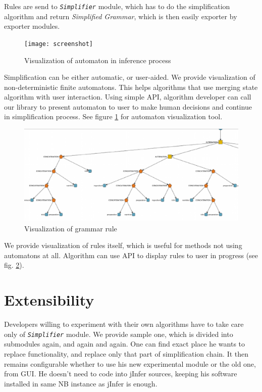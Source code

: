 \documentclass[a4paper,8pt,oneside,twocolumn]{article}
\newcommand{\myscale}{0.9}
\newcommand{\jmodule}[1]{\texttt{\textit{#1}}}
\begin{document}
Rules are send to \jmodule{Simplifier} module, which has to do the simplification algorithm and return \emph{Simplified Grammar}, which is then easily exporter by exporter modules.

\begin{figure}
	\centering\texttt{[image: screenshot]}
	\caption{Visualization of automaton in inference process} \label{screenshot}
\end{figure}
Simplification can be either automatic, or user-aided.
We provide visualization of non-deterministic finite automatons.
This helps algorithms that use merging state algorithm with user interaction.
Using simple API, algorithm developer can call our library to present automaton to user to make human decisions and continue in simplification process.
See figure \ref{screenshot} for automaton visualization tool.

\begin{figure}
	\centering\includegraphics[width=\myscale\columnwidth]{ruledisplayer}
	\caption{Visualization of grammar rule} \label{ruledisplayer}
\end{figure}
We provide visualization of rules itself, which is useful for methods not using automatons at all.
Algorithm can use API to display rules to user in progress (see fig. \ref{ruledisplayer}).

\section*{Extensibility}
Developers willing to experiment with their own algorithms have to take care only of \jmodule{Simplifier} module.
We provide sample one, which is divided into submodules again, and again and again.
One can find exact place he wants to replace functionality, and replace only that part of simplification chain.
It then remains configurable whether to use his new experimental module or the old one, from GUI.
He doesn't need to code into jInfer sources, keeping his software installed in same NB instance as jInfer is enough.
\end{document}
